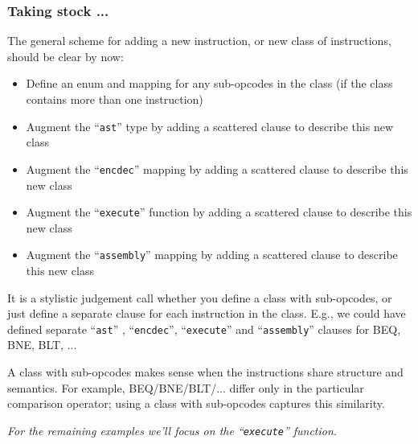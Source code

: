 \documentclass[aspectratio=169]{beamer}
\newcommand{\slidefont}{\scriptsize}
\newcommand{\cf}{\scriptsize\tt}
\begin{document}
\begin{frame}[fragile]
  \frametitle{Taking stock ...}

  \label{slide-taking-stock-1}

  \slidefont

  The general scheme for adding a new instruction, or new class of instructions, should be clear by now:
  \begin{itemize}
    \item Define an enum and mapping for any sub-opcodes in the class
      (if the class contains more than one instruction)
    \item Augment the ``{\cf ast}'' type by adding a scattered clause to describe this new class
    \item Augment the ``{\cf encdec}'' mapping by adding a scattered clause to describe this new class
    \item Augment the ``{\cf execute}'' function by adding a scattered clause to describe this new class
    \item Augment the ``{\cf assembly}'' mapping by adding a scattered clause to describe this new class
  \end{itemize}

  \vspace{1ex}

  It is a stylistic judgement call whether you define a class with
  sub-opcodes, or just define a separate clause for each instruction
  in the class.  E.g., we could have defined separate ``{\cf ast}'' ,
  ``{\cf encdec}'', ``{\cf execute}'' and ``{\cf assembly}'' clauses
  for BEQ, BNE, BLT, ...

  \vspace{1ex}

  A class with sub-opcodes makes sense when the instructions share
  structure and semantics.  For example, BEQ/BNE/BLT/... differ only
  in the particular comparison operator; using a class with
  sub-opcodes captures this similarity.

  \vspace{1ex}

  \centering
  \emph{For the remaining examples we'll focus on the ``{\cf execute}'' function.}

\end{frame}

\end{document}
